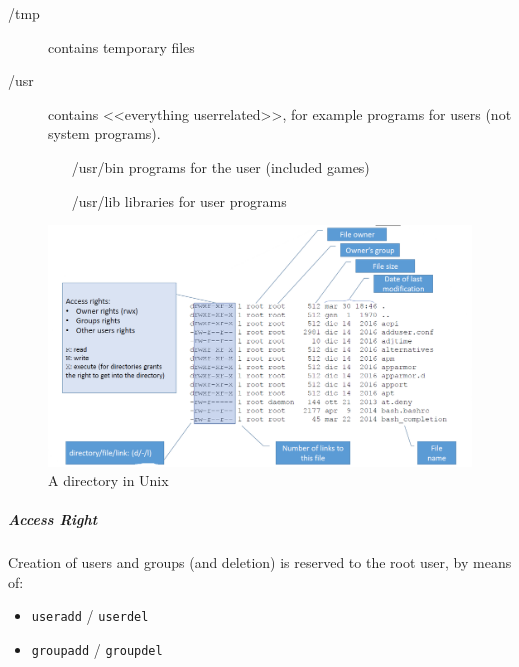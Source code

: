\documentclass{article}
\begin{document}
\begin{description}
\begin{itemize}
                                \end{itemize}
                                \item[/tmp] contains temporary files
                                \item[/usr] contains <<everything user\-related>>, for example programs for users (not system programs).
                                \begin{itemize}
                                    \item[/usr/bin] programs for the user (included games)
                                    \item[/usr/lib] libraries for user programs
                                \end{itemize}
                            \end{description}

                            \begin{figure}[h]
                                \begin{center}
                                    \includegraphics[scale=0.5]{../immagini/Directory_unix.png}
                                \end{center}
                                \caption{A directory in Unix}
                            \end{figure}

                            \subparagraph{Access Right}
                            Creation of users and groups (and deletion) is reserved to the root user, by means of:
                            \begin{itemize}
                                \item \texttt{useradd} / \texttt{userdel}
                                \item \texttt{groupadd} / \texttt{groupdel}
                            \end{itemize}
                            
\end{document}
